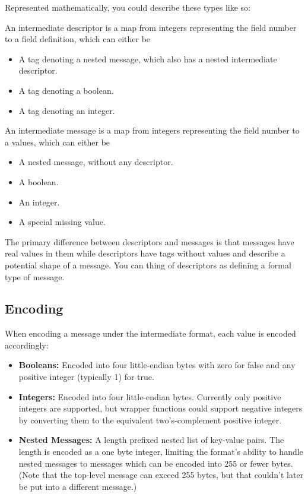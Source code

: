 Represented mathematically, you could describe these types like so:

\vspace{1em}
\begin{definition}\label{def:ip-desc}
 An intermediate descriptor is a map from integers representing the field number
 to a field definition, which can either be
 \begin{itemize}
 \item A tag denoting a nested message, which also has a nested intermediate descriptor.
 \item A tag denoting a boolean.
 \item A tag denoting an integer.
 \end{itemize}
\end{definition}

\vspace{1em}
\begin{definition}\label{def:ip-msg}
  An intermediate message is a map from integers representing the field number
  to a values, which can either be
  \begin{itemize}
  \item A nested message, without any descriptor.
  \item A boolean.
  \item An integer.
  \item A special missing value.
  \end{itemize}
\end{definition}

The primary difference between descriptors and messages is that messages have
real values in them while descriptors have tags without values and describe a
potential shape of a message. You can thing of descriptors as defining a formal
type of message.

\subsection{Encoding}\label{sec:ip-encoding}

When encoding a message under the intermediate format, each value is encoded
accordingly:
\begin{itemize}
\item \textbf{Booleans:} Encoded into four little-endian bytes with zero for
  false and any positive integer (typically 1) for true.
\item \textbf{Integers:} Encoded into four little-endian bytes. Currently only
  positive integers are supported, but wrapper functions could support negative
  integers by converting them to the equivalent two's-complement positive
  integer.
\item \textbf{Nested Messages:} A length prefixed nested list of key-value
  pairs. The length is encoded as a one byte integer, limiting the format's
  ability to handle nested messages to messages which can be encoded into 255 or
  fewer bytes. (Note that the top-level message can exceed 255 bytes, but that
  couldn't later be put into a different message.)
\end{itemize}

